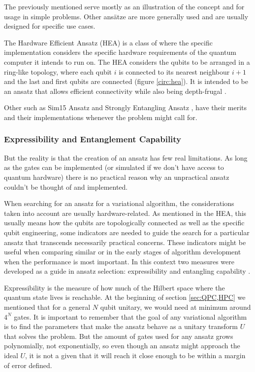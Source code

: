 

The previously mentioned \mya serve mostly as an illustration of the concept and for usage in simple problems. Other ans{\"a}tze are more generally used and are usually designed for specific use cases.

The Hardware Efficient Ansatz (HEA) \cite{kandala_hardware-efficient_2017} is a class of \mya where the specific implementation considers the specific hardware requirements of the quantum computer it intends to run on. The HEA considers the qubits to be arranged in a ring-like topology, where each qubit $i$ is connected to its nearest neighbour $i+1$ and the last and first qubits are connected (figure \ref{circ:hea}). It is intended to be an ansatz that allows efficient connectivity while also being depth-frugal \cite{park_hardware-efficient_2024}.


Other \mya such as Sim15 Ansatz \cite{sim_expressibility_2019} and Strongly Entangling Ansatz \cite{schetakis_binary_2021}, have their merits and their implementations whenever the problem might call for.

\subsubsection{Expressibility and Entanglement Capability}

But the reality is that the creation of an ansatz has few real limitations. As long as the gates can be implemented (or simulated if we don't have access to quantum hardware) there is no practical reason why an unpractical ansatz couldn't be thought of and implemented.

When searching for an ansatz for a variational algorithm, the considerations taken into account are usually hardware-related. As mentioned in the HEA, this usually means how the qubits are topologically connected as well as the specific qubit engineering, some indicators are needed to guide the search for a particular ansatz that transcends necessarily practical concerns. These indicators might be useful when comparing similar \mya or in the early stages of algorithm development when the performance is most important. In this context two measures were developed as a guide in ansatz selection: expressibility and entangling capability \cite{sim_expressibility_2019}.

Expressibility is the measure of how much of the Hilbert space where the quantum state lives is reachable. At the beginning of section \ref{sec:QPC,HPC} we mentioned that for a general $N$ qubit unitary, we would need at minimum around $4^N$ gates. It is important to remember that the goal of any variational algorithm is to find the parameters that make the ansatz behave as a unitary transform $U$ that solves the problem. But the amount of gates used for any ansatz grows polynomially, not exponentially, so even though an ansatz might approach the ideal $U$, it is not a given that it will reach it close enough to be within a margin of error defined.

